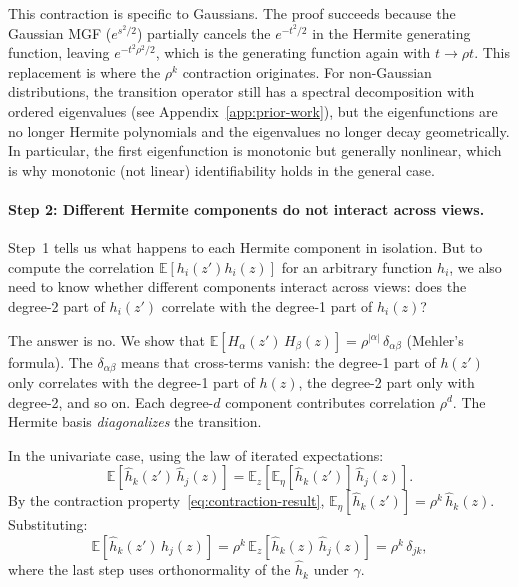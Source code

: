 This contraction is specific to Gaussians.
The proof succeeds because the Gaussian MGF ($e^{s^2/2}$) partially cancels the $e^{-t^2/2}$ in the Hermite generating function, leaving $e^{-t^2\rho^2/2}$, which is the generating function again with $t \to \rho t$.
This replacement is where the $\rho^k$ contraction originates.
For non-Gaussian distributions, the transition operator still has a spectral decomposition with ordered eigenvalues (see Appendix~\ref{app:prior-work}), but the eigenfunctions are no longer Hermite polynomials and the eigenvalues no longer decay geometrically. In particular, the first eigenfunction is monotonic but generally nonlinear, which is why monotonic (not linear) identifiability holds in the general case.



\paragraph{Step 2: Different Hermite components do not interact across views.}
Step~1 tells us what happens to each Hermite component in isolation.
But to compute the correlation $\mathbb{E}[h_i(z') h_i(z)]$ for an arbitrary function $h_i$, we also need to know whether different components interact across views: does the degree-2 part of $h_i(z')$ correlate with the degree-1 part of $h_i(z)$?

The answer is no.
We show that $\mathbb{E}[H_\alpha(z')\, H_\beta(z)] = \rho^{|\alpha|}\,\delta_{\alpha\beta}$ (Mehler's formula).
The $\delta_{\alpha\beta}$ means that cross-terms vanish: the degree-1 part of $h(z')$ only correlates with the degree-1 part of $h(z)$, the degree-2 part only with degree-2, and so on.
Each degree-$d$ component contributes correlation $\rho^d$.
The Hermite basis \textit{diagonalizes} the transition.

In the univariate case, using the law of iterated expectations:
\begin{equation}
    \mathbb{E}\!\left[\hat{h}_k(z')\,\hat{h}_j(z)\right] = \mathbb{E}_z\!\left[\mathbb{E}_\eta\!\left[\hat{h}_k(z')\right]\,\hat{h}_j(z)\right].
\end{equation}
By the contraction property~\eqref{eq:contraction-result}, $\mathbb{E}_\eta[\hat{h}_k(z')] = \rho^k\,\hat{h}_k(z)$.
Substituting:
\begin{equation}
    \mathbb{E}\!\left[\hat{h}_k(z')\,\hat{h}_j(z)\right] = \rho^k\,\mathbb{E}_z\!\left[\hat{h}_k(z)\,\hat{h}_j(z)\right] = \rho^k\,\delta_{jk},
\end{equation}
where the last step uses orthonormality of the $\hat{h}_k$ under $\gamma$.

